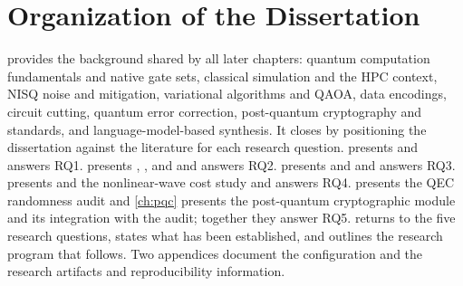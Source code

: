 \section{Organization of the Dissertation}\label{sec:intro:organization}

 provides the background shared by all later chapters: quantum computation fundamentals and native gate sets, classical simulation and the HPC context, NISQ noise and mitigation, variational algorithms and QAOA, data encodings, circuit cutting, quantum error correction, post-quantum cryptography and standards, and language-model-based synthesis. It closes by positioning the dissertation against the literature for each research question.  presents \qgear{} and answers RQ1.  presents \qpie, \vqt, \shardq{} and \nnqa{} and answers RQ2.  presents \deal{} and \qawa{} and answers RQ3.  presents \rubriq{} and the nonlinear-wave cost study and answers RQ4.  presents the QEC randomness audit and \cref{ch:pqc} presents the post-quantum cryptographic module and its integration with the audit; together they answer RQ5.  returns to the five research questions, states what has been established, and outlines the research program that follows. Two appendices document the \qgear{} configuration and the research artifacts and reproducibility information.
